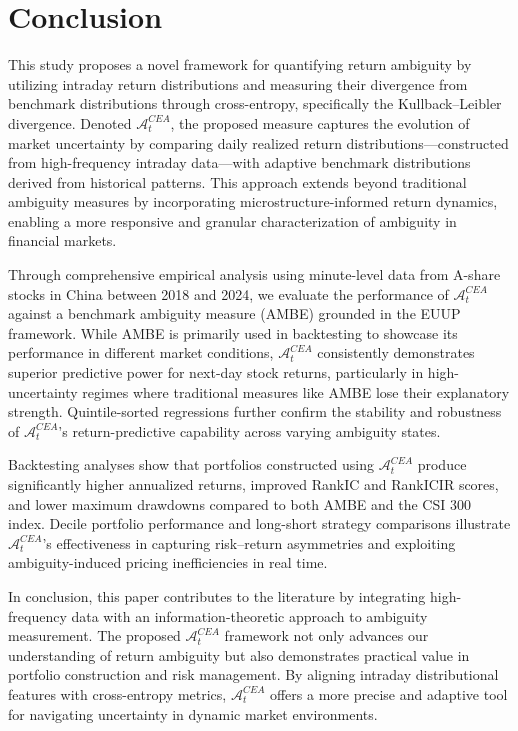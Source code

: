 \documentclass[preprint,12pt,authoryear]{elsarticle}
\begin{document}
\section{Conclusion}
\label{sec:conclusion}

This study proposes a novel framework for quantifying return ambiguity by utilizing intraday return distributions and measuring their divergence from benchmark distributions through cross-entropy, specifically the Kullback–Leibler divergence. Denoted \(\mathcal{A}^{CEA}_t\), the proposed measure captures the evolution of market uncertainty by comparing daily realized return distributions—constructed from high-frequency intraday data—with adaptive benchmark distributions derived from historical patterns. This approach extends beyond traditional ambiguity measures by incorporating microstructure-informed return dynamics, enabling a more responsive and granular characterization of ambiguity in financial markets.

Through comprehensive empirical analysis using minute-level data from A-share stocks in China between 2018 and 2024, we evaluate the performance of \(\mathcal{A}^{CEA}_t\) against a benchmark ambiguity measure (AMBE) grounded in the EUUP framework. While AMBE is primarily used in backtesting to showcase its performance in different market conditions, \(\mathcal{A}^{CEA}_t\) consistently demonstrates superior predictive power for next-day stock returns, particularly in high-uncertainty regimes where traditional measures like AMBE lose their explanatory strength. Quintile-sorted regressions further confirm the stability and robustness of \(\mathcal{A}^{CEA}_t\)'s return-predictive capability across varying ambiguity states.

Backtesting analyses show that portfolios constructed using \(\mathcal{A}^{CEA}_t\) produce significantly higher annualized returns, improved RankIC and RankICIR scores, and lower maximum drawdowns compared to both AMBE and the CSI 300 index. Decile portfolio performance and long-short strategy comparisons illustrate \(\mathcal{A}^{CEA}_t\)'s effectiveness in capturing risk–return asymmetries and exploiting ambiguity-induced pricing inefficiencies in real time.

In conclusion, this paper contributes to the literature by integrating high-frequency data with an information-theoretic approach to ambiguity measurement. The proposed \(\mathcal{A}^{CEA}_t\) framework not only advances our understanding of return ambiguity but also demonstrates practical value in portfolio construction and risk management. By aligning intraday distributional features with cross-entropy metrics, \(\mathcal{A}^{CEA}_t\) offers a more precise and adaptive tool for navigating uncertainty in dynamic market environments.


\end{document}
